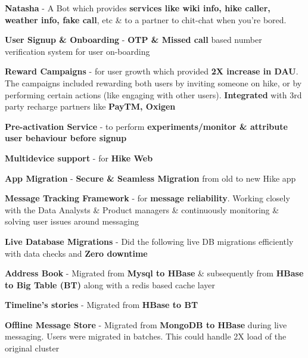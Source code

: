\begin{cventries}
{\begin{cvitems}
\begin{cventries}
{\begin{cvsubitems}
		        \item {\textbf{Natasha} - A Bot which provides \textbf{services like wiki info, hike caller, weather info, fake call}, etc \& to a partner to chit-chat when you're bored.}
		        \item {\textbf{User Signup \& Onboarding} - \textbf{OTP \& Missed call} based number verification system for user on-boarding}
		        \item {\textbf{Reward Campaigns} - for user growth which provided \textbf{2X increase in DAU}. The campaigns included rewarding both users by inviting someone on hike, or by performing certain actions (like engaging with other users). \textbf{Integrated} with 3rd party recharge partners like \textbf{PayTM, Oxigen}}
		        \item {\textbf{Pre-activation Service} - to perform \textbf{experiments/monitor \& attribute user behaviour before signup}}
        		\item {\textbf{Multidevice support} - for \textbf{Hike Web}}
        		\item {\textbf{App Migration} - \textbf{Secure \& Seamless Migration} from old to new Hike app}
            	\item {\textbf{Message Tracking Framework} - for \textbf{message reliability}. Working closely with the Data Analysts \& Product managers \& continuously monitoring \& solving user issues around messaging}
              \end{cvsubitems}
            }
        \end{cventries}
		\item {\textbf{Live Database Migrations} - Did the following live DB migrations efficiently with data checks and \textbf{Zero downtime}}
        \begin{cventries}
          \cventry
            {} %
            {} %
            {} %
            {} %
            {
             \vspace{-20pt}
              \begin{cvsubitems}
                \item {\textbf{Address Book} - Migrated from \textbf{Mysql to HBase} \& subsequently from \textbf{HBase to Big Table (BT)} along with a redis based cache layer}
                \item {\textbf{Timeline's stories} - Migrated from \textbf{HBase to BT}}
                \item {\textbf{Offline Message Store} - Migrated from \textbf{MongoDB to HBase} during live messaging. Users were migrated in batches. This could handle 2X load of the original cluster}

\end{cvsubitems}}
\end{cventries}
\end{cvitems}}
\end{cventries}
